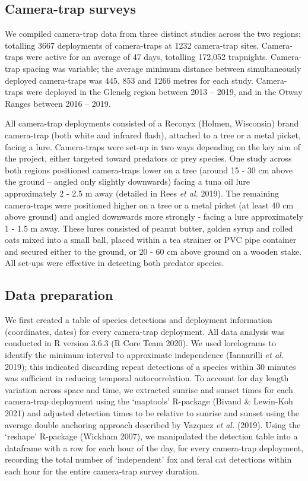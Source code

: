 \documentclass[11pt,a4paper,titlepage,twoside,openright]{style/unimelbthesis}
\begin{document}
\begin{mainmatter}
\hypertarget{camera-trap-surveys-1}{%
\subsection{Camera-trap surveys}\label{camera-trap-surveys-1}}

We compiled camera-trap data from three distinct studies across the two regions; totalling 3667 deployments of camera-traps at 1232 camera-trap sites. Camera-traps were active for an average of 47 days, totalling 172,052 trapnights. Camera-trap spacing was variable; the average minimum distance between simultaneously deployed camera-traps was 445, 853 and 1266 metres for each study. Camera-traps were deployed in the Glenelg region between 2013 -- 2019, and in the Otway Ranges between 2016 -- 2019.

All camera-trap deployments consisted of a Reconyx (Holmen, Wisconsin) brand camera-trap (both white and infrared flash), attached to a tree or a metal picket, facing a lure. Camera-traps were set-up in two ways depending on the key aim of the project, either targeted toward predators or prey species. One study across both regions positioned camera-traps lower on a tree (around 15 - 30 cm above the ground -- angled only slightly downwards) facing a tuna oil lure approximately 2 - 2.5 m away (detailed in Rees \emph{et al.} 2019). The remaining camera-traps were positioned higher on a tree or a metal picket (at least 40 cm above ground) and angled downwards more strongly - facing a lure approximately 1 - 1.5 m away. These lures consisted of peanut butter, golden syrup and rolled oats mixed into a small ball, placed within a tea strainer or PVC pipe container and secured either to the ground, or 20 - 60 cm above ground on a wooden stake. All set-ups were effective in detecting both predator species.

\hypertarget{data-preparation}{%
\subsection{Data preparation}\label{data-preparation}}

We first created a table of species detections and deployment information (coordinates, dates) for every camera-trap deployment. All data analysis was conducted in R version 3.6.3 (R Core Team 2020). We used lorelograms to identify the minimum interval to approximate independence (Iannarilli \emph{et al.} 2019); this indicated discarding repeat detections of a species within 30 minutes was sufficient in reducing temporal autocorrelation. To account for day length variation across space and time, we extracted sunrise and sunset times for each camera-trap deployment using the `maptools' R-package (Bivand \& Lewin-Koh 2021) and adjusted detection times to be relative to sunrise and sunset using the average double anchoring approach described by Vazquez \emph{et al.} (2019). Using the `reshape' R-package (Wickham 2007), we manipulated the detection table into a dataframe with a row for each hour of the day, for every camera-trap deployment, recording the total number of `independent' fox and feral cat detections within each hour for the entire camera-trap survey duration.


\end{mainmatter}
\end{document}
